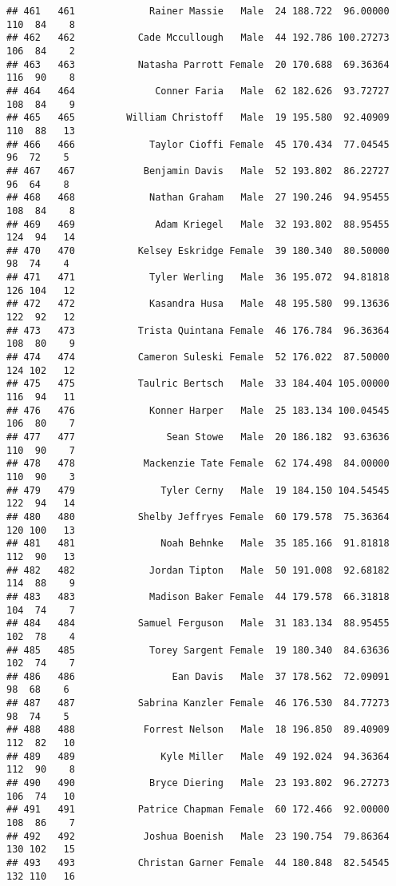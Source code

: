 \documentclass[
]{article}
\begin{document}
\begin{verbatim}
## 461   461             Rainer Massie   Male  24 188.722  96.00000 110  84    8
## 462   462           Cade Mccullough   Male  44 192.786 100.27273 106  84    2
## 463   463           Natasha Parrott Female  20 170.688  69.36364 116  90    8
## 464   464              Conner Faria   Male  62 182.626  93.72727 108  84    9
## 465   465         William Christoff   Male  19 195.580  92.40909 110  88   13
## 466   466             Taylor Cioffi Female  45 170.434  77.04545  96  72    5
## 467   467            Benjamin Davis   Male  52 193.802  86.22727  96  64    8
## 468   468             Nathan Graham   Male  27 190.246  94.95455 108  84    8
## 469   469              Adam Kriegel   Male  32 193.802  88.95455 124  94   14
## 470   470           Kelsey Eskridge Female  39 180.340  80.50000  98  74    4
## 471   471             Tyler Werling   Male  36 195.072  94.81818 126 104   12
## 472   472             Kasandra Husa   Male  48 195.580  99.13636 122  92   12
## 473   473           Trista Quintana Female  46 176.784  96.36364 108  80    9
## 474   474           Cameron Suleski Female  52 176.022  87.50000 124 102   12
## 475   475           Taulric Bertsch   Male  33 184.404 105.00000 116  94   11
## 476   476             Konner Harper   Male  25 183.134 100.04545 106  80    7
## 477   477                Sean Stowe   Male  20 186.182  93.63636 110  90    7
## 478   478            Mackenzie Tate Female  62 174.498  84.00000 110  90    3
## 479   479               Tyler Cerny   Male  19 184.150 104.54545 122  94   14
## 480   480           Shelby Jeffryes Female  60 179.578  75.36364 120 100   13
## 481   481               Noah Behnke   Male  35 185.166  91.81818 112  90   13
## 482   482             Jordan Tipton   Male  50 191.008  92.68182 114  88    9
## 483   483             Madison Baker Female  44 179.578  66.31818 104  74    7
## 484   484           Samuel Ferguson   Male  31 183.134  88.95455 102  78    4
## 485   485             Torey Sargent Female  19 180.340  84.63636 102  74    7
## 486   486                 Ean Davis   Male  37 178.562  72.09091  98  68    6
## 487   487           Sabrina Kanzler Female  46 176.530  84.77273  98  74    5
## 488   488            Forrest Nelson   Male  18 196.850  89.40909 112  82   10
## 489   489               Kyle Miller   Male  49 192.024  94.36364 112  90    8
## 490   490             Bryce Diering   Male  23 193.802  96.27273 106  74   10
## 491   491           Patrice Chapman Female  60 172.466  92.00000 108  86    7
## 492   492            Joshua Boenish   Male  23 190.754  79.86364 130 102   15
## 493   493           Christan Garner Female  44 180.848  82.54545 132 110   16

\end{verbatim}
\end{document}

